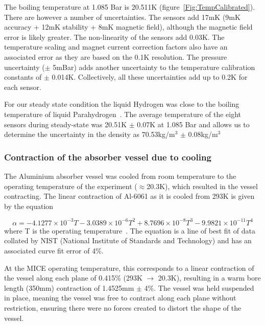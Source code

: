  The boiling temperature at 1.085 Bar is 20.511K (figure~\ref{Fig:TempCalibrated}). There are however a number of uncertainties. The sensors add 17mK (9mK accuracy + 12mK stability + 8mK magnetic field), although the magnetic field error is likely greater. The non-linearity of the sensors add 0.03K. The temperature scaling and magnet current correction factors also have an associated error as they are based on the 0.1K resolution.
The pressure uncertainty ($\mathrm{\pm}$ 5mBar) adds another uncertainty to the temperature calibration constants of $\mathrm{\pm}$ 0.014K. Collectively, all these uncertainties add up to 0.2K for each sensor.
 
For our steady state condition the liquid Hydrogen was close to the boiling temperature of liquid Parahydrogen~\cite{NOTE524}. The average temperature of the eight sensors during steady-state was 20.51K $\mathrm{\pm}$ 0.07K at 1.085 Bar and allows us to determine the uncertainty in the density as 70.53kg/m${}^{3}$ $\mathrm{\pm}$ 0.08kg/m${}^{3}$
 

\subsubsection{Contraction of the absorber vessel due to cooling}
\label{SubSect:Absorber_Contraction}

The Aluminium absorber vessel was cooled from room temperature to the operating temperature of the
experiment ($\mathrm{\approx}$20.3K), which resulted in the vessel contracting. The linear contraction of
Al-6061 as it is cooled from 293K is given by the equation

\begin{equation}
  \alpha =-4.1277\times {10}^{-3}T-3.0389\times {10}^{-6}T^2+8.7696\times {10}^{-8}T^3-9.9821\times {10}^{-11}T^4
\end{equation}
where T is the operating temperature~\cite{Hardin}. The equation is a line of best fit of data collated by NIST
(National Institute of Standards and Technology) and has an associated curve fit error of 4\%.

At the MICE operating temperature, this corresponds to a linear contraction of the vessel along each plane of 0.415\%
(293K $\mathrm{\to}$ 20.3K), resulting in a warm bore length (350mm) contraction of 1.4525mm
$\mathrm{\pm}$ 4\%. The vessel was held suspended in place, meaning the vessel was free to contract along
each plane without restriction, ensuring there were no forces created to distort the shape of the vessel.


